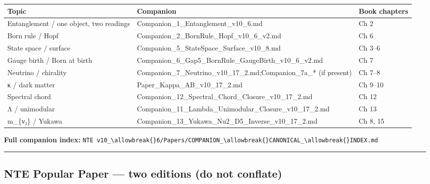 \documentclass[
  11pt,
]{article}
\newcounter{none} %
\begin{document}
{\def\LTcaptype{none} %
\begin{longtable}[]{@{}
  >{\raggedright\arraybackslash}p{}
  >{\raggedright\arraybackslash}p{}
  >{\raggedright\arraybackslash}p{}@{}}
\toprule\noalign{}
\begin{minipage}[b]{\linewidth}\raggedright
Topic
\end{minipage} & \begin{minipage}[b]{\linewidth}\raggedright
Companion
\end{minipage} & \begin{minipage}[b]{\linewidth}\raggedright
Book chapters
\end{minipage} \\
\midrule\noalign{}
\endhead
\bottomrule\noalign{}
\endlastfoot
Entanglement / one object, two readings &
Companion\_1\_Entanglement\_v10\_6.md & Ch 2 \\
Born rule / Hopf & Companion\_2\_BornRule\_Hopf\_v10\_6\_v2.md & Ch 6 \\
State space / surface & Companion\_5\_StateSpace\_Surface\_v10\_8.md &
Ch 3--6 \\
Gauge birth / Born at birth &
Companion\_6\_Gap5\_BornRule\_GaugeBirth\_v10\_6\_v2.md & Ch 7 \\
Neutrino / chirality &
Companion\_7\_Neutrino\_v10\_17\_2.md;Companion\_7a\_* (if present) & Ch
7--8 \\
κ / dark matter & Paper\_Kappa\_AB\_v10\_17\_2.md & Ch 9--10 \\
Spectral chord & Companion\_12\_Spectral\_Chord\_Closure\_v10\_17\_2.md
& Ch 12 \\
Λ / unimodular &
Companion\_11\_Lambda\_Unimodular\_Closure\_v10\_17\_2.md & Ch 13 \\
m\_\{ν₂\} / Yukawa &
Companion\_13\_Yukawa\_Nu2\_D5\_Inverse\_v10\_17\_2.md & Ch 8, 15 \\
\end{longtable}
}

\textbf{Full companion index:}
\texttt{NTE\ v10\_\textbackslash{}allowbreak\{\}6/Papers/COMPANION\_\textbackslash{}allowbreak\{\}CANONICAL\_\textbackslash{}allowbreak\{\}INDEX.md}

\begin{center}\rule{0.5\linewidth}{0.5pt}\end{center}

\subsection{NTE Popular Paper --- two editions (do not
conflate)}\label{nte-popular-paper-two-editions-do-not-conflate}
\end{document}
